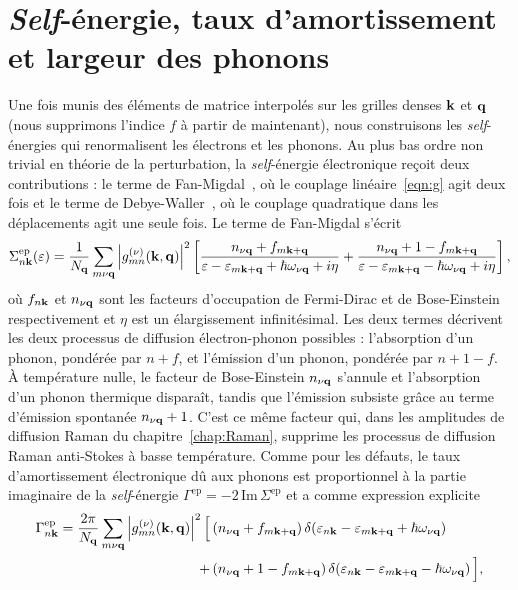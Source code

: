 \section{\textit{Self}-énergie, taux d'amortissement et largeur des phonons}\label{sec:g_self}

Une fois munis des éléments de matrice interpolés sur les grilles denses $\mathbf{k}$ et $\mathbf{q}$ (nous supprimons l'indice $f$ à partir de maintenant), nous construisons les \textit{self}-énergies qui renormalisent les électrons et les phonons. Au plus bas ordre non trivial en théorie de la perturbation, la \textit{self}-énergie électronique reçoit deux contributions : le terme de Fan-Migdal~\cite{fanTemperatureDependenceEnergy1951,migdalINTERACTIONELECTRONSLATTICE1958}, où le couplage linéaire~\eqref{eqn:g} agit deux fois et le terme de Debye-Waller~\cite{allenTheoryTemperatureDependence1976,allenTheoryTemperatureDependence1981}, où le couplage quadratique dans les déplacements agit une seule fois. Le terme de Fan-Migdal s'écrit
\begin{equation}
    \Sigma^\text{ep}_{n\mathbf{k}}(\varepsilon) = \frac{1}{N_{\mathbf{q}}}\sum_{m\nu\mathbf{q}}
    \left|g_{mn}^{(\nu)}(\mathbf{k},\mathbf{q})\right|^2
    \left[
    \frac{n_{\nu\mathbf{q}}+f_{m\mathbf{k}+\mathbf{q}}}{\varepsilon-\varepsilon_{m\mathbf{k}+\mathbf{q}}+\hbar\omega_{\nu\mathbf{q}}+i\eta}
    +\frac{n_{\nu\mathbf{q}}+1-f_{m\mathbf{k}+\mathbf{q}}}{\varepsilon-\varepsilon_{m\mathbf{k}+\mathbf{q}}-\hbar\omega_{\nu\mathbf{q}}+i\eta}
    \right],
    \label{eqn:fan_migdal}
\end{equation}
où $f_{n\mathbf{k}}$ et $n_{\nu\mathbf{q}}$ sont les facteurs d'occupation de Fermi-Dirac et de Bose-Einstein respectivement et $\eta$ est un élargissement infinitésimal. Les deux termes décrivent les deux processus de diffusion électron-phonon possibles : l'absorption d'un phonon, pondérée par $n+f$, et l'émission d'un phonon, pondérée par $n+1-f$. À température nulle, le facteur de Bose-Einstein $n_{\nu\mathbf{q}}$ s'annule et l'absorption d'un phonon thermique disparaît, tandis que l'émission subsiste grâce au terme d'émission spontanée $n_{\nu\mathbf{q}}+1$. C'est ce même facteur qui, dans les amplitudes de diffusion Raman du chapitre~\ref{chap:Raman}, supprime les processus de diffusion Raman anti-Stokes à basse température. Comme pour les défauts, le taux d'amortissement électronique dû aux phonons est proportionnel à la partie imaginaire de la \textit{self}-énergie $\Gamma^\text{ep} =-2\,\mathrm{Im}\,\Sigma^\text{ep}$ et a comme expression explicite
\begin{align}
    \Gamma^\text{ep}_{n\mathbf{k}} = \frac{2\pi}{N_{\mathbf{q}}}\sum_{m\nu\mathbf{q}}
    \left|g_{mn}^{(\nu)}(\mathbf{k},\mathbf{q})\right|^2
    \Big[&\left(n_{\nu\mathbf{q}}+f_{m\mathbf{k}+\mathbf{q}}\right)
    \delta\!\left(\varepsilon_{n\mathbf{k}}-\varepsilon_{m\mathbf{k}+\mathbf{q}}+\hbar\omega_{\nu\mathbf{q}}\right)\notag\\
    +&\left(n_{\nu\mathbf{q}}+1-f_{m\mathbf{k}+\mathbf{q}}\right)
    \delta\!\left(\varepsilon_{n\mathbf{k}}-\varepsilon_{m\mathbf{k}+\mathbf{q}}-\hbar\omega_{\nu\mathbf{q}}\right)\Big],
    \label{eqn:gamma_ep_explicite}
\end{align}

